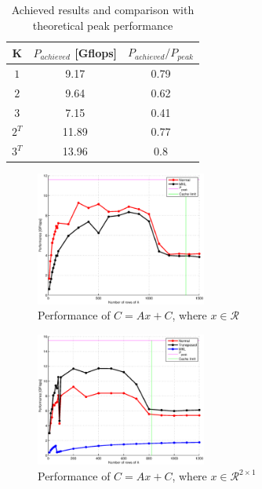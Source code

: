\documentclass[journal, a4paper]{IEEEtran}
\begin{document}
  \begin{table}[!hbt]
    \begin{center}
      \caption{Achieved results and comparison with theoretical peak performance}
      \label{tab:results}
      \begin{tabular}{c|c|c}
	K	& $P_{achieved}$ [Gflops] & $P_{achieved} / P_{peak}$\\
	\hline
	$1$	& 9.17 & 0.79 \\
	\hline
	$2$	& 9.64 & 0.62 \\
	\hline
	$3$	& 7.15 & 0.41 \\
	\hline
	$2^T$	& 11.89 & 0.77 \\
	\hline
	$3^T$	& 13.96 & 0.8 \\
      \end{tabular}
    \end{center}
  \end{table}
  
  
  \begin{figure}
   \includegraphics[width=0.5\textwidth]{1x1}
   \caption{Performance of $C = Ax + C$, where $x \in \mathcal{R}$}
   \label{fig:1x1}
  \end{figure}
  
  \begin{figure}
   \includegraphics[width=0.5\textwidth]{2x1}
   \caption{Performance of $C = Ax + C$, where $x \in \mathcal{R}^{2\times 1}$}
   \label{fig:2x1}
  \end{figure}
  
\end{document}
